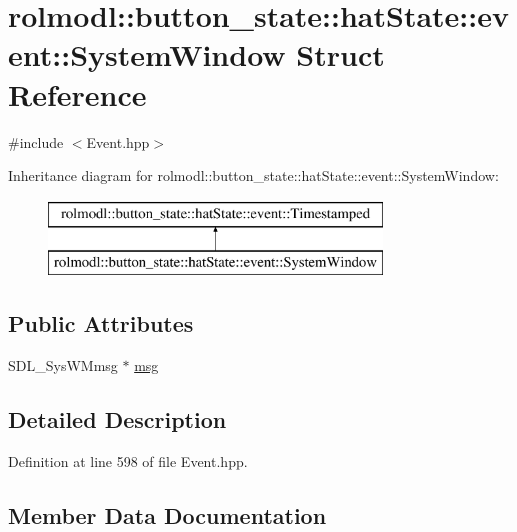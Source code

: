 \hypertarget{structrolmodl_1_1button__state_1_1hat_state_1_1event_1_1_system_window}{}\section{rolmodl\+::button\+\_\+state\+::hat\+State\+::event\+::System\+Window Struct Reference}
\label{structrolmodl_1_1button__state_1_1hat_state_1_1event_1_1_system_window}


{\ttfamily \#include $<$Event.\+hpp$>$}

Inheritance diagram for rolmodl\+::button\+\_\+state\+::hat\+State\+::event\+::System\+Window\+:\begin{figure}[H]
\begin{center}
\leavevmode
\includegraphics[height=2.000000cm]{structrolmodl_1_1button__state_1_1hat_state_1_1event_1_1_system_window}
\end{center}
\end{figure}
\subsection*{Public Attributes}
\begin{DoxyCompactItemize}
\item 
S\+D\+L\+\_\+\+Sys\+W\+Mmsg $\ast$ \mbox{\hyperlink{structrolmodl_1_1button__state_1_1hat_state_1_1event_1_1_system_window_af7da6e4bd2b353523bb6653734591819}{msg}}
\end{DoxyCompactItemize}


\subsection{Detailed Description}


Definition at line 598 of file Event.\+hpp.



\subsection{Member Data Documentation}
\mbox{\label{structrolmodl_1_1button__state_1_1hat_state_1_1event_1_1_system_window_af7da6e4bd2b353523bb6653734591819}} 
